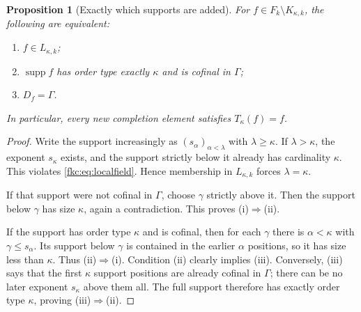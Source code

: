 \documentclass[11pt,letterpaper]{article}
\numberwithin{equation}{section}
\newtheorem{proposition}[theorem]{Proposition}
\theoremstyle{definition}
\theoremstyle{remark}
\newcommand{\supp}{\operatorname{supp}}
\newcommand{\K}{K_{\kappa,k}}
\begin{document}
\begin{proposition}[Exactly which supports are added]\label{fkc:prop:new-supports}
For $f\in F_k\setminus\K$, the following are equivalent:
\begin{enumerate}[label=\textup{(\roman*)}]
\item $f\in L_{\kappa,k}$;
\item $\supp f$ has order type exactly $\kappa$ and is cofinal in $\Gamma$;
\item $D_f=\Gamma$.
\end{enumerate}
In particular, every new completion element satisfies $T_\kappa(f)=f$.
\end{proposition}
\begin{proof}
Write the support increasingly as $(s_\alpha)_{\alpha<\lambda}$ with $\lambda\ge\kappa$. If $\lambda>\kappa$, the exponent $s_\kappa$ exists, and the support strictly below it already has cardinality $\kappa$. This violates \eqref{fkc:eq:localfield}. Hence membership in $L_{\kappa,k}$ forces $\lambda=\kappa$.

If that support were not cofinal in $\Gamma$, choose $\gamma$ strictly above it. Then the support below $\gamma$ has size $\kappa$, again a contradiction. This proves (i)$\Rightarrow$(ii).

If the support has order type $\kappa$ and is cofinal, then for each $\gamma$ there is $\alpha<\kappa$ with $\gamma\le s_\alpha$. Its support below $\gamma$ is contained in the earlier $\alpha$ positions, so it has size less than $\kappa$. Thus (ii)$\Rightarrow$(i). Condition (ii) clearly implies (iii). Conversely, (iii) says that the first $\kappa$ support positions are already cofinal in $\Gamma$; there can be no later exponent $s_\kappa$ above them all. The full support therefore has exactly order type $\kappa$, proving (iii)$\Rightarrow$(ii).
\end{proof}
\end{document}
